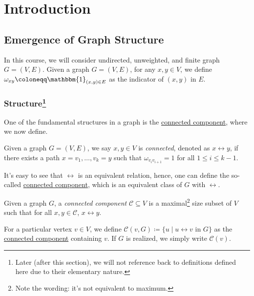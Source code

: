 \chapter{Introduction}

\section{Emergence of Graph Structure}
In this course, we will consider undirected, unweighted, and finite graph \(G = (V, E)\). Given a graph \(G = (V, E)\), for any \(x, y \in V\), we define \(\omega _{xy} \coloneqq \mathbbm{1}_{(x, y) \in E} \) as the indicator of \((x, y)\) in \(E\).

\subsection[Structure]{Structure\protect\footnote{Later (after this section), we will not reference back to definitions defined here due to their elementary nature.}}
One of the fundamental structures in a graph is the \hyperref[def:connected-component]{connected component}, where we now define.

\begin{definition}[Connected]\label{def:connected}
	Given a graph \(G = (V, E)\), we say \(x, y \in V\) is \emph{connected}, denoted as \(x \leftrightarrow y\), if there exists a path \(x = v_1, \dots, v_k = y\) such that \(\omega _{v_i v_{i+1}} = 1\) for all \(1 \leq i \leq k-1\).
\end{definition}

It's easy to see that \(\leftrightarrow \) is an equivalent relation, hence, one can define the so-called \hyperref[def:connected-component]{connected component}, which is an equivalent class of \(G\) with \(\leftrightarrow \).

\begin{definition}\label{def:connected-component}
	Given a graph \(G\), a \emph{connected component} \(\mathcal{C} \subseteq V\) is a maximal\footnote{Note the wording: it's not equivalent to maximum.} size subset of \(V\) such that for all \(x, y \in \mathcal{C} \), \(x \leftrightarrow y\).
\end{definition}

\begin{notation}
	For a particular vertex \(v \in V\), we define \(\mathcal{C} (v, G) \coloneqq \{ u \mid u \leftrightarrow v \text{ in } G\} \) as the \hyperref[def:connected-component]{connected component} containing \(v\). If \(G\) is realized, we simply write \(\mathcal{C} (v)\).
\end{notation}

